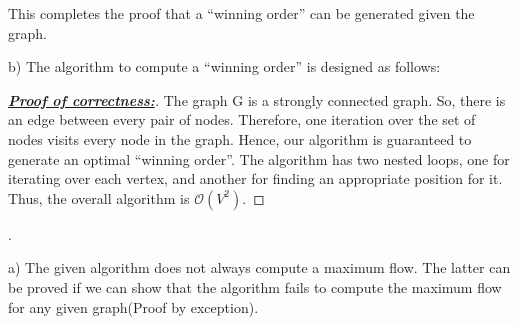 \documentclass[assign]{article}
\newcommand{\Oo}{\mathcal{O}}
\begin{document}
\vspace{-5pt}
\noindent This completes the proof that a ``winning order'' can be generated given the graph. 
 
\par \noindent b) The algorithm to compute a ``winning order'' is designed as follows:


\begin{proof}[\underline{\bf{Proof of correctness:}}] The graph G is a strongly connected graph. So, there is an edge between every pair of nodes. Therefore, one iteration over the set of nodes visits every node in the graph. Hence, our algorithm is guaranteed to generate an optimal ``winning order''. The algorithm has two nested loops, one for iterating over each vertex, and another for finding an appropriate position for it. Thus, the overall algorithm is $\Oo(V^2)$.
\end{proof}

. 
\par \noindent a) The given algorithm does not always compute a maximum flow. The latter can be proved if we can show that the algorithm fails to compute the maximum flow for any given graph(Proof by exception).
\end{document}
